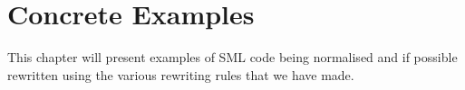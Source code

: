\chapter{Concrete Examples} 

This chapter will present examples of SML code being normalised and if possible
rewritten using the various rewriting rules that we have made.








